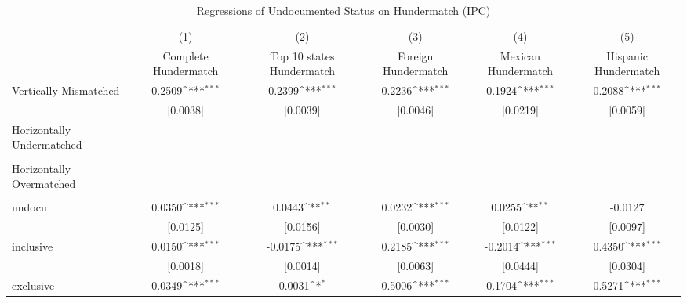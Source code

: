 \begin{table}[htbp]\centering
\def\sym#1{\ifmmode^{#1}\else\(^{#1}\)\fi}
\caption{Regressions of Undocumented Status on Hundermatch (IPC)}
\begin{tabular}{l*{5}{c}}
\toprule
                    &\multicolumn{1}{c}{(1)}         &\multicolumn{1}{c}{(2)}         &\multicolumn{1}{c}{(3)}         &\multicolumn{1}{c}{(4)}         &\multicolumn{1}{c}{(5)}         \\
                    &Complete Hundermatch         &Top 10 states Hundermatch         &Foreign Hundermatch         &Mexican Hundermatch         &Hispanic Hundermatch         \\
\midrule
Vertically Mismatched&      0.2509\sym{***}&      0.2399\sym{***}&      0.2236\sym{***}&      0.1924\sym{***}&      0.2088\sym{***}\\
                    &    [0.0038]         &    [0.0039]         &    [0.0046]         &    [0.0219]         &    [0.0059]         \\
\addlinespace
Horizontally Undermatched&                     &                     &                     &                     &                     \\
                    &                     &                     &                     &                     &                     \\
\addlinespace
Horizontally Overmatched&                     &                     &                     &                     &                     \\
                    &                     &                     &                     &                     &                     \\
\addlinespace
undocu              &      0.0350\sym{***}&      0.0443\sym{**} &      0.0232\sym{***}&      0.0255\sym{**} &     -0.0127         \\
                    &    [0.0125]         &    [0.0156]         &    [0.0030]         &    [0.0122]         &    [0.0097]         \\
\addlinespace
inclusive           &      0.0150\sym{***}&     -0.0175\sym{***}&      0.2185\sym{***}&     -0.2014\sym{***}&      0.4350\sym{***}\\
                    &    [0.0018]         &    [0.0014]         &    [0.0063]         &    [0.0444]         &    [0.0304]         \\
\addlinespace
exclusive           &      0.0349\sym{***}&      0.0031\sym{*}  &      0.5006\sym{***}&      0.1704\sym{***}&      0.5271\sym{***}\\

\end{tabular}
\end{table}
